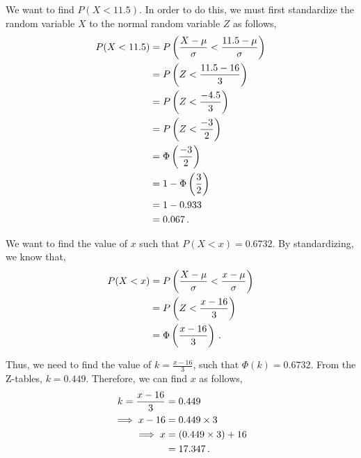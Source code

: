 \begin{subquestions}
\begin{subsubquestions}
We want to find $P(X<11.5)$. In order to do this, we must first standardize the random variable $X$ to the normal random variable $Z$ as follows,
\begin{align}
	P(X<11.5) & = P\left(\frac{X- \mu}{\sigma} < \frac{11.5- \mu}{\sigma}\right) \nonumber \\
	          & = P\left(Z < \frac{11.5- 16}{3}\right) \nonumber \\
	          & = P\left(Z < \frac{-4.5}{3}\right) \nonumber \\
	          & = P\left(Z < \frac{-3}{2}\right) \nonumber \\
	          & = \Phi\left(\frac{-3}{2}\right) \nonumber \\
	          & = 1 - \Phi\left(\frac{3}{2} \right) \nonumber \\
	          & = 1 - 0.933 \nonumber \\
	          & = 0.067 \,.
\end{align}


\subsubquestion

We want to find the value of $x$ such that $P(X<x)=0.6732$. By standardizing, we know that,
\begin{align}
	P(X<x) & = P\left(\frac{X-\mu}{\sigma} < \frac{x - \mu}{\sigma}\right) \nonumber \\
	       & = P\left(Z < \frac{x - 16}{3}\right) \nonumber \\
	       & = \Phi\left(\frac{x-16}{3}\right) \,.
\end{align}

Thus, we need to find the value of $k=\frac{x-16}{3}$, such that $\Phi(k)=0.6732$. From the Z-tables, $k=0.449$. Therefore, we can find $x$ as follows,
\begin{align}
	k = \frac{x-16}{3} & = 0.449 \nonumber \\
	   \implies x-16 & = 0.449 \times 3 \nonumber \\
	   \implies x & = (0.449 \times 3) + 16 \nonumber \\
	              & = 17.347 \,.
\end{align}

\end{subsubquestions}

\end{subquestions}